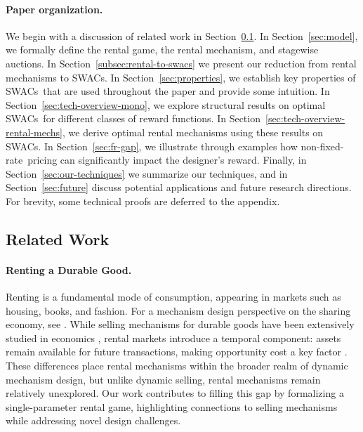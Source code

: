 \documentclass[11pt,letterpaper]{article}
\newcommand{\fr}{fixed-rate\xspace}
\newcommand{\swacs}{SWACs\xspace}
\theoremstyle{plain}
\begin{document}
\paragraph{Paper organization.}
We begin with a discussion of related work in Section~\ref{sec:related}.
In Section~\ref{sec:model}, we formally define the rental game, the rental mechanism, and stagewise auctions.
In Section~\ref{subsec:rental-to-swacs} we present our reduction from rental mechanisms to \swacs.
In Section~\ref{sec:properties}, we establish key properties of \swacs\ that are used throughout the paper and provide some intuition.
In Section~\ref{sec:tech-overview-mono}, we explore structural results on optimal \swacs\ for different classes of reward functions. In Section~\ref{sec:tech-overview-rental-mechs}, we derive optimal rental mechanisms using these results on \swacs.
In Section~\ref{sec:fr-gap}, we illustrate through examples how non-\fr\ pricing can significantly impact the designer's reward.
Finally, in Section~\ref{sec:our-techniques} we summarize our techniques, and in Section~\ref{sec:future} discuss potential applications and future research directions.
For brevity, some technical proofs are deferred to the appendix.
\subsection{Related Work}
\label{sec:related}

\paragraph{Renting a Durable Good.} Renting is a fundamental mode of consumption, appearing in markets such as housing, books, and fashion. For a mechanism design perspective on the sharing economy, see \cite{OrenR21}. While selling mechanisms for durable goods have been extensively studied in economics \cite{doval2024optimal}, rental markets introduce a temporal component: assets remain available for future transactions, making opportunity cost a key factor \cite{beccuti2020optimality,cremer2003rental}. These differences place rental mechanisms within the broader realm of dynamic mechanism design, but unlike dynamic selling, rental mechanisms remain relatively unexplored. Our work contributes to filling this gap by formalizing a single-parameter rental game, highlighting connections to selling mechanisms while addressing novel design challenges.
\end{document}
